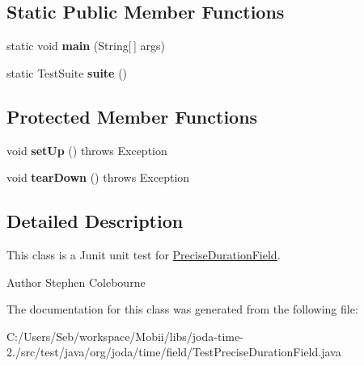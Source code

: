 \subsection*{Static Public Member Functions}
\begin{DoxyCompactItemize}
\item 
\hypertarget{classorg_1_1joda_1_1time_1_1field_1_1_test_precise_duration_field_a6ce08a009e1d7f336776acfd4ab0815c}{static void {\bfseries main} (String\mbox{[}$\,$\mbox{]} args)}\label{classorg_1_1joda_1_1time_1_1field_1_1_test_precise_duration_field_a6ce08a009e1d7f336776acfd4ab0815c}

\item 
\hypertarget{classorg_1_1joda_1_1time_1_1field_1_1_test_precise_duration_field_a1364d5da6f03db4e4ea6054d674ad5c2}{static Test\-Suite {\bfseries suite} ()}\label{classorg_1_1joda_1_1time_1_1field_1_1_test_precise_duration_field_a1364d5da6f03db4e4ea6054d674ad5c2}

\end{DoxyCompactItemize}
\subsection*{Protected Member Functions}
\begin{DoxyCompactItemize}
\item 
\hypertarget{classorg_1_1joda_1_1time_1_1field_1_1_test_precise_duration_field_a2cd4580b2217946496a8f4fc34eff968}{void {\bfseries set\-Up} ()  throws Exception }\label{classorg_1_1joda_1_1time_1_1field_1_1_test_precise_duration_field_a2cd4580b2217946496a8f4fc34eff968}

\item 
\hypertarget{classorg_1_1joda_1_1time_1_1field_1_1_test_precise_duration_field_a0f32f39a5bf91763bcc6e0e30bfb07c7}{void {\bfseries tear\-Down} ()  throws Exception }\label{classorg_1_1joda_1_1time_1_1field_1_1_test_precise_duration_field_a0f32f39a5bf91763bcc6e0e30bfb07c7}

\end{DoxyCompactItemize}


\subsection{Detailed Description}
This class is a Junit unit test for \hyperlink{classorg_1_1joda_1_1time_1_1field_1_1_precise_duration_field}{Precise\-Duration\-Field}.

\begin{DoxyAuthor}{Author}
Stephen Colebourne 
\end{DoxyAuthor}


The documentation for this class was generated from the following file\-:\begin{DoxyCompactItemize}
\item 
C\-:/\-Users/\-Seb/workspace/\-Mobii/libs/joda-\/time-\/2./src/test/java/org/joda/time/field/Test\-Precise\-Duration\-Field.\-java\end{DoxyCompactItemize}
